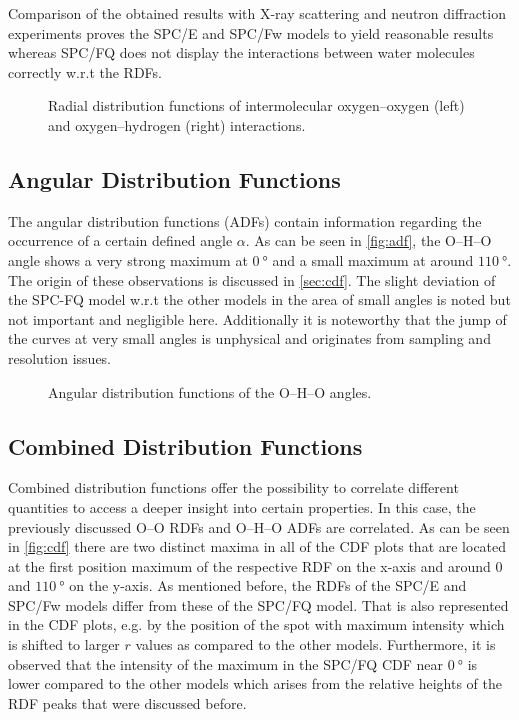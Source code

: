 \documentclass[a4paper,12pt]{scrartcl}
\begin{document}
		Comparison of the obtained results with X-ray scattering\autocite{hura2000high} and neutron diffraction\autocite{soper2000radial} experiments proves the SPC/E and SPC/Fw models to yield reasonable results whereas SPC/FQ does not display the interactions between water molecules correctly w.r.t the RDFs.
		
		\begin{figure}
			\centering
			
			\vspace{-20pt}
			\caption{Radial distribution functions of intermolecular oxygen--oxygen (left) and oxygen--hydrogen (right) interactions.}
			\label{fig:rdf}
		\end{figure}
	\subsection{Angular Distribution Functions}
		The angular distribution functions (ADFs) contain information regarding the occurrence of a certain defined angle $ \alpha $. As can be seen in \autoref{fig:adf}, the O--H--O angle shows a very strong maximum at $ \SI{0}{\degree} $ and a small maximum at around $ \SI{110}{\degree} $. The origin of these observations is discussed in \autoref{sec:cdf}. The slight deviation of the SPC-FQ model w.r.t the other models in the area of small angles is noted but not important and negligible here. Additionally it is noteworthy that the jump of the curves at very small angles is unphysical and originates from sampling and resolution issues.
		
		\begin{figure}
			\centering
			
			\vspace{-20pt}
			\caption{Angular distribution functions of the O--H--O angles.}
			\label{fig:adf}
		\end{figure}
	\subsection{Combined Distribution Functions}
	\label{sec:cdf}
		Combined distribution functions offer the possibility to correlate different quantities to access a deeper insight into certain properties. In this case, the previously discussed O--O RDFs and O--H--O ADFs are correlated. As can be seen in \autoref{fig:cdf} there are two distinct maxima in all of the CDF plots that are located at the first position maximum of the respective RDF on the x-axis and around 0 and $ \SI{110}{\degree}  $ on the y-axis. As mentioned before, the RDFs of the SPC/E and SPC/Fw models differ from these of the SPC/FQ model. That is also represented in the CDF plots, e.g. by the position of the spot with maximum intensity which is shifted to larger $ r $ values as compared to the other models. Furthermore, it is observed that the intensity of the maximum in the SPC/FQ CDF near $ \SI{0}{\degree} $ is lower compared to the other models which arises from the relative heights of the RDF peaks that were discussed before.
		
\end{document}
